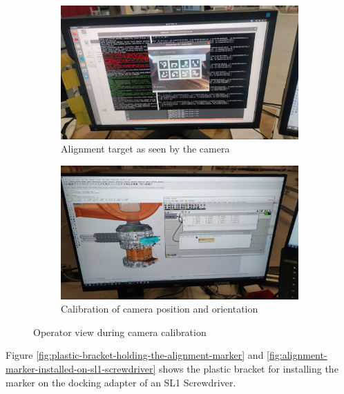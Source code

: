 \begin{figure}[!h]
    \centering
    \begin{subfigure}[b]{0.49\textwidth}
        \centering
        \includegraphics[width=\textwidth]{images/7a/img76.jpg}
        \caption{Alignment target as seen by the camera}
        \label{fig:alignment-target-as-seen-by-the-camera}
    \end{subfigure}
    \hfill
    \begin{subfigure}[b]{0.49\textwidth}
        \centering
        \includegraphics[width=\textwidth]{images/7a/img77.jpg}
        \caption{Calibration of camera position and orientation}
        \label{fig:camera-calibrated-position-and-orientation}
    \end{subfigure}
    \caption{Operator view during camera calibration}
    \label{fig:operator-view-during-camera-calibration}
\end{figure}

Figure \ref{fig:plastic-bracket-holding-the-alignment-marker} and \ref{fig:alignment-marker-installed-on-sl1-screwdriver} shows the plastic bracket for installing the marker on the docking adapter of an SL1 Screwdriver. 


